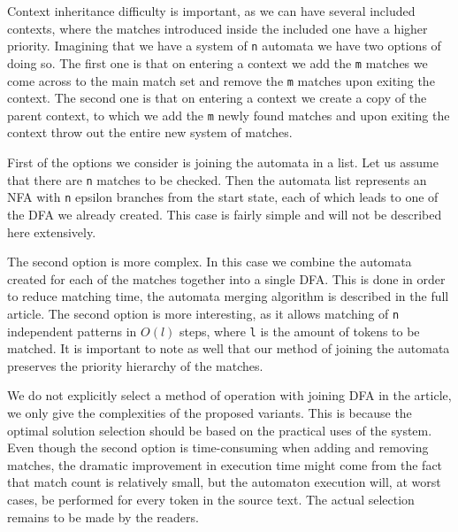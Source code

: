 Context inheritance difficulty is important, as we can have several included
contexts, where the matches introduced inside the included one have a higher
priority. Imagining that we have a system of \verb/n/ automata we have two
options of doing so. The first one is that on entering a context we add the
\verb/m/ matches we come across to the main match set and remove the \verb/m/
matches upon exiting the context. The second one is that on entering a context
we create a copy of the parent context, to which we add the \verb/m/ newly
found matches and upon exiting the context throw out the entire new system of
matches.

First of the options we consider is joining the automata in a list. Let us
assume that there are \verb/n/ matches to be checked. Then the automata list
represents an NFA with \verb/n/ epsilon branches from the start state, each of
which leads to one of the DFA we already created. This case is fairly simple
and will not be described here extensively.

The second option is more complex. In this case we combine the automata created
for each of the matches together into a single DFA. This is done in order to
reduce matching time, the automata merging algorithm is described in the full
article.  The second option is more interesting, as it allows matching of
\verb/n/ independent patterns in $O(l)$ steps, where \verb/l/ is the amount
of tokens to be matched. It is important to note as well that our method of
joining the automata preserves the priority hierarchy of the matches. 

We do not explicitly select a method of operation with joining DFA in the
article, we only give the complexities of the proposed variants. This is
because the optimal solution selection should be based on the practical uses of
the system. Even though the second option is time-consuming when adding and
removing matches, the dramatic improvement in execution time might come from
the fact that match count is relatively small, but the automaton execution
will, at worst cases, be performed for every token in the source text. The
actual selection remains to be made by the readers.

